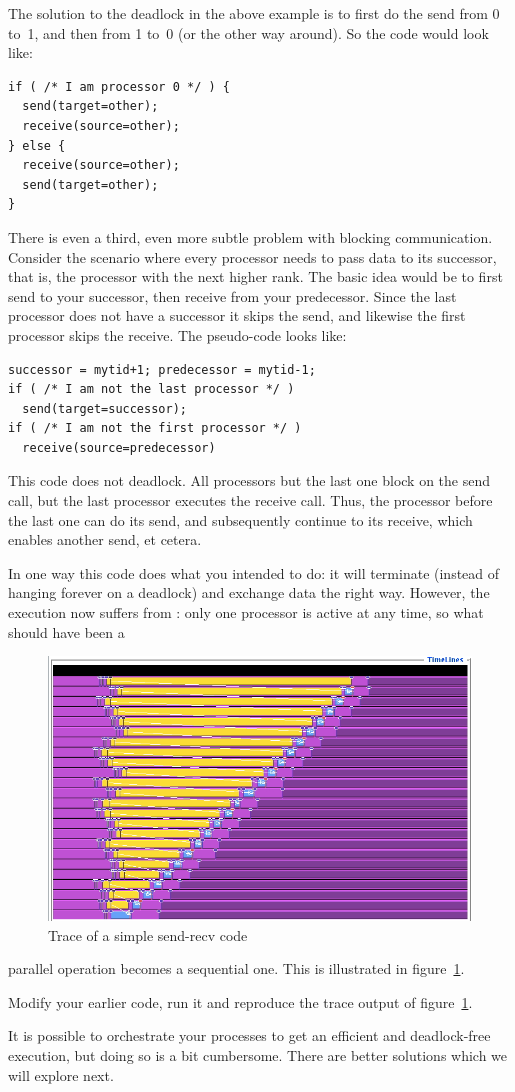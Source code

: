 The solution to the deadlock in the above example
is to first do the send from 0 to~1, and then from 1 to~0 (or the other way around). So the code would look like:
\begin{verbatim}
if ( /* I am processor 0 */ ) {
  send(target=other);
  receive(source=other);
} else {
  receive(source=other);
  send(target=other);
}
\end{verbatim}

There is even a third, even more subtle problem with blocking
communication. Consider the scenario where every processor needs to
pass data to its successor, that is, the processor with the next
higher rank. The basic idea would be to first send to your successor,
then receive from your predecessor. Since the last processor does not
have a successor it skips the send, and likewise the first processor
skips the receive. The pseudo-code looks like:
\begin{verbatim}
successor = mytid+1; predecessor = mytid-1;
if ( /* I am not the last processor */ )
  send(target=successor);
if ( /* I am not the first processor */ )
  receive(source=predecessor)
\end{verbatim}
This code does not deadlock. All processors but the last one block on
the send call, but the last processor executes the receive call. Thus,
the processor before the last one can do its send, and subsequently
continue to its receive, which enables another send, et cetera.

In one way this code does what you intended to do:
it will terminate (instead of hanging forever on a
deadlock) and exchange data the right way. However, the execution
now suffers from : only
one processor is active at any time, so what should have been a
\begin{figure}[ht]
\includegraphics[scale=.4]{graphics/linear-serial}
\caption{Trace of a simple send-recv code}
\label{fig:serialization}
\end{figure}
parallel operation becomes a sequential one. This is illustrated in
figure~\ref{fig:serialization}.
\begin{exercise}
\label{ex:linear-sequential}
  Modify your earlier code, run it and reproduce the trace output 
  of figure~\ref{fig:serialization}.
\end{exercise}
It is possible to orchestrate your processes to get an efficient and
deadlock-free execution, but doing so is a bit cumbersome.
There are better solutions which we will
explore next.

